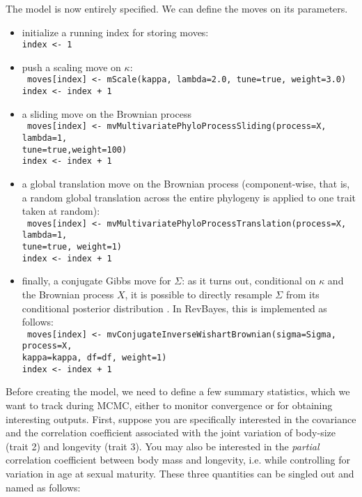 \documentclass[usletter]{article}
\newcommand{\cmd}[1]{\texttt{#1}}
\begin{document}
The model is now entirely specified. We can define the moves on its parameters.
\begin{itemize}
\item
initialize a running index for storing moves:
\\
\cmd{index <- 1}
\item
push a scaling move on $\kappa$:
\\
\cmd{
moves[index] <- mScale(kappa, lambda=2.0, tune=true, weight=3.0)
\\
index <- index + 1
}
\item
a sliding move on the Brownian process
\\
\cmd{
moves[index] <- mvMultivariatePhyloProcessSliding(process=X, lambda=1,
\\
tune=true,weight=100)
\\
index <- index + 1
}
\item
a global translation move on the Brownian process (component-wise, that is, a random global translation across the entire phylogeny is applied to one trait taken at random):
\\
\cmd{
moves[index] <- mvMultivariatePhyloProcessTranslation(process=X, lambda=1,
\\
tune=true, weight=1)
\\
index <- index + 1
}
\item
finally, a conjugate Gibbs move for $\Sigma$: as it turns out, conditional on $\kappa$ and the Brownian process $X$, it is possible to directly resample $\Sigma$ from its conditional posterior distribution \citep{Lartillot:2011p55}. In RevBayes, this is implemented as follows:
\\
\cmd{
moves[index] <- mvConjugateInverseWishartBrownian(sigma=Sigma, process=X,
\\
kappa=kappa, df=df, weight=1)
\\
index <- index + 1
}
\end{itemize}
Before creating the model, we need to define a few summary statistics, which we want to track during MCMC, either to monitor convergence or for obtaining interesting outputs.
First, suppose you are specifically interested in the covariance and the correlation coefficient associated with the joint variation of body-size (trait 2) and longevity (trait 3). You may also be interested in the \emph{partial} correlation coefficient between body mass and longevity, i.e. while controlling for variation in age at sexual maturity. These three quantities can be singled out and named as follows:
\end{document}
